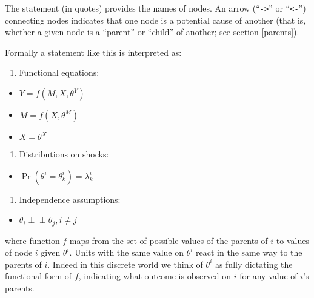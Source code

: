 \documentclass[
  12pt,
]{book}
\providecommand{\tightlist}{%
  \setlength{\itemsep}{0pt}\setlength{\parskip}{0pt}}
\begin{document}
The statement (in quotes) provides the names of nodes. An arrow (``\texttt{-\textgreater{}}'' or ``\texttt{\textless{}-}'') connecting nodes indicates that one node is a potential cause of another (that is, whether a given node is a ``parent'' or ``child'' of another; see section \ref{parents}).

Formally a statement like this is interpreted as:

\begin{enumerate}
\def\labelenumi{\arabic{enumi}.}
\tightlist
\item
  Functional equations:
\end{enumerate}

\begin{itemize}
\tightlist
\item
  \(Y = f(M, X, \theta^Y)\)
\item
  \(M = f(X, \theta^M)\)
\item
  \(X = \theta^X\)
\end{itemize}

\begin{enumerate}
\def\labelenumi{\arabic{enumi}.}
\setcounter{enumi}{1}
\tightlist
\item
  Distributions on shocks:
\end{enumerate}

\begin{itemize}
\tightlist
\item
  \(\Pr(\theta^i = \theta^i_k) = \lambda^i_k\)
\end{itemize}

\begin{enumerate}
\def\labelenumi{\arabic{enumi}.}
\setcounter{enumi}{2}
\tightlist
\item
  Independence assumptions:\\
\end{enumerate}

\begin{itemize}
\tightlist
\item
  \(\theta_i \perp\!\!\! \perp \theta_j, i\neq j\)
\end{itemize}

where function \(f\) maps from the set of possible values of the parents of \(i\) to values of node \(i\) given \(\theta^i\). Units with the same value on \(\theta^i\) react in the same way to the parents of \(i\). Indeed in this discrete world we think of \(\theta^i\) as fully dictating the functional form of \(f\), indicating what outcome is observed on \(i\) for any value of \(i\)'s parents.
\end{document}
